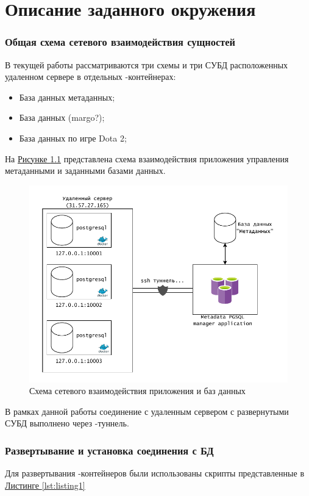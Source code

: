 \chapter{Описание заданного окружения}
\subsection*{Общая схема сетевого взаимодействия сущностей}
В текущей работы рассматриваются три схемы и три СУБД расположенных удаленном сервере в отдельных -контейнерах:
\begin{itemize}
	\item База данных метаданных;
	\item База данных (margo?);
	\item База данных по игре Dota 2;
\end{itemize}

На \hyperref[fig:general-schema]{Рисунке \ref*{fig:general-schema}} представлена схема взаимодействия приложения управления метаданными и заданными базами данных.
\begin{figure}[h!]
	\centering
	\includegraphics[width=1\linewidth]{docker-general-schema.drawio.pdf}
	\caption{Схема сетевого взаимодействия приложения и баз данных}
	\label{fig:general-schema}
\end{figure}

В рамках данной работы соединение с удаленным сервером с развернутыми СУБД выполнено через -туннель.

\subsection*{Развертывание и установка соединения с БД}
Для развертывания -контейнеров были использованы  скрипты представленные в \hyperref[lst:listing1]{Листинге \ref*{lst:listing1}}

